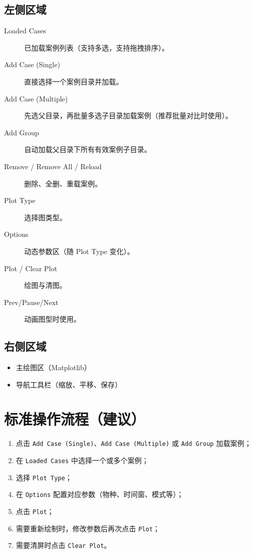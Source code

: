 \documentclass[11pt,a4paper]{ctexart}
\begin{document}
\subsection{左侧区域}
\begin{description}
  \item[Loaded Cases] 已加载案例列表（支持多选，支持拖拽排序）。
  \item[Add Case (Single)] 直接选择一个案例目录并加载。
  \item[Add Case (Multiple)] 先选父目录，再批量多选子目录加载案例（推荐批量对比时使用）。
  \item[Add Group] 自动加载父目录下所有有效案例子目录。
  \item[Remove / Remove All / Reload] 删除、全删、重载案例。
  \item[Plot Type] 选择图类型。
  \item[Options] 动态参数区（随 Plot Type 变化）。
  \item[Plot / Clear Plot] 绘图与清图。
  \item[Prev/Pause/Next] 动画图型时使用。
\end{description}

\subsection{右侧区域}
\begin{itemize}
  \item 主绘图区（Matplotlib）
  \item 导航工具栏（缩放、平移、保存）
\end{itemize}

\section{标准操作流程（建议）}
\begin{enumerate}
  \item 点击 \texttt{Add Case (Single)}、\texttt{Add Case (Multiple)} 或 \texttt{Add Group} 加载案例；
  \item 在 \texttt{Loaded Cases} 中选择一个或多个案例；
  \item 选择 \texttt{Plot Type}；
  \item 在 \texttt{Options} 配置对应参数（物种、时间窗、模式等）；
  \item 点击 \texttt{Plot}；
  \item 需要重新绘制时，修改参数后再次点击 \texttt{Plot}；
  \item 需要清屏时点击 \texttt{Clear Plot}。
\end{enumerate}
\end{document}
